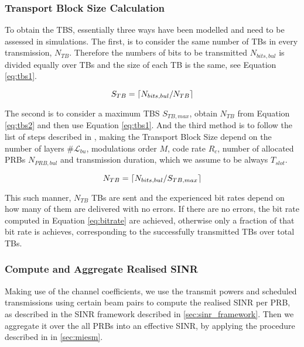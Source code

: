 \subsubsection*{Transport Block Size Calculation}

To obtain the \ac{TBS}, essentially three ways have been modelled and need to be assessed in simulations. The first, is to consider the same number of TBs in every transmission, $N_{TB}$. Therefore the numbers of bits to be transmitted $N_{bits, bul}$ is divided equally over TBs and the size of each TB is the same, see Equation \eqref{eq:tbs1}.


\begin{equation} \label{eq:tbs1}
    S_{TB} = \lceil N_{bits, bul}/N_{TB}\rceil    
\end{equation}

The second is to consider a maximum TBS $S_{TB, max}$, obtain $N_{TB}$ from Equation \eqref{eq:tbs2} and then use Equation \eqref{eq:tbs1}. And the third method is to follow the list of steps described in \cite{3gpp-codebooks}, making the Transport Block Size depend on the number of layers $\#\mathcal{L}_{bu}$, modulations order $M$, code rate $R_c$, number of allocated PRBs $N_{PRB, bul}$ and transmission duration, which we assume to be always $T_{slot}$.

\begin{equation} \label{eq:tbs2}
    N_{TB} = \lceil N_{bits, bul}/S_{TB, max}\rceil
\end{equation}



This such manner, $N_{TB}$ TBs are sent and the experienced bit rates depend on how many of them are delivered with no errors. If there are no errors, the bit rate computed in Equation \eqref{eq:bitrate} are achieved, otherwise only a fraction of that bit rate is achieves, corresponding to the successfully transmitted TBs over total TBs.

\subsubsection*{Compute and Aggregate Realised SINR}
Making use of the channel coefficients, we use the transmit powers and scheduled transmissions using certain beam pairs to compute the realised SINR per PRB, as described in the SINR framework described in \ref{sec:sinr_framework}. Then we aggregate it over the all PRBs into an effective SINR, by applying the procedure described in in \ref{sec:miesm}.

